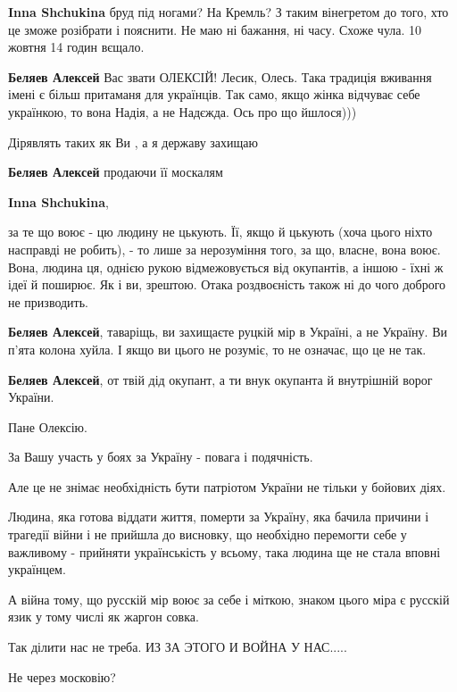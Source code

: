 \begin{itemize}
\begin{itemize}
\textbf{Inna Shchukina} бруд під ногами? На Кремль? З таким вінегретом до того, хто це зможе розібрати і пояснити. Не маю ні бажання, ні часу. Схоже чула. 10 жовтня 14 годин вєщало.

\textbf{Беляев Алексей} Вас звати ОЛЕКСІЙ! Лесик, Олесь. Така традиція вживання імені є більш притаманя для українців. Так само, якщо жінка відчуває себе українкою, то вона Надія, а не Надєжда. Ось про що йшлося)))

Дірявлять таких як Ви , а я державу захищаю

\textbf{Беляев Алексей} продаючи її москалям

\textbf{Inna Shchukina}, 

за те що воює - цю людину не цькують. Її, якщо й цькують (хоча цього ніхто
насправді не робить), - то лише за нерозуміння того, за що, власне, вона воює.
Вона, людина ця, однією рукою відмежовується від окупантів, а іншою - їхні ж
ідеї й поширює. Як і ви, зрештою. Отака роздвоєність також ні до чого доброго
не призводить.

\textbf{Беляев Алексей}, таваріщь, ви захищаєте руцкій мір в Україні, а не Україну. Ви п'ята колона хуйла. І якщо ви цього не розуміє, то не означає, що це не так.

\textbf{Беляев Алексей}, от твій дід окупант, а ти внук окупанта й внутрішній ворог України.

Пане Олексію.

За Вашу участь у боях за Україну - повага і подячність.

Але це не знімає необхідність бути патріотом України не тільки у бойових діях.

Людина, яка готова віддати життя, померти за Україну, яка бачила причини і
трагедії війни і не прийшла до висновку, що необхідно перемогти себе у
важливому - прийняти українськість у всьому, така людина ще не стала вповні
українцем.

А війна тому, що русскій мір воює за себе і міткою, знаком цього міра є русскій
язик у тому числі як жаргон совка.

\end{itemize} %

Так ділити нас не треба. ИЗ ЗА ЭТОГО И ВОЙНА У НАС.....

\begin{itemize} %
Не через московію?


\end{itemize}
\end{itemize}
